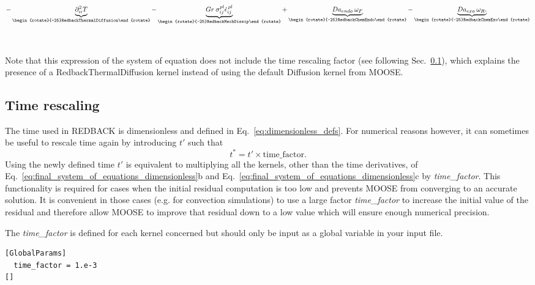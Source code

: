 \documentclass[]{scrreprt}
\newcommand{\moose}{{MOOSE}}
\newcommand{\redback}{{REDBACK}}
\newcommand{\pd}{\ensuremath{\partial}}
\begin{document}
\begin{align*}
  - \underbrace{ \pd_{ii}^2 T   }_{\begin{rotate}{-25}RedbackThermalDiffusion\end{rotate}}  
  - \underbrace{ Gr \: \sigma_{ij}^{pl}\dot{\epsilon}_{ij}^{\,pl}  }_{\begin{rotate}{-25}RedbackMechDissip\end{rotate}} 
  + \underbrace{ Da_{endo}\: \omega_F }_{\begin{rotate}{-25}RedbackChemEndo\end{rotate}} 
  - \underbrace{ Da_{exo}\: \omega_R. }_{\begin{rotate}{-25}RedbackChemExo\end{rotate}} \\ \\ \\
\end{align*}

Note that this expression of the system of equation does not include the time rescaling factor (see following Sec.~\ref{subsec:time_rescaling}), which explains the presence of a RedbackThermalDiffusion kernel instead of using the default Diffusion kernel from \moose{}.

\subsection{Time rescaling}
\label{subsec:time_rescaling}
The time used in \redback{} is dimensionless and defined in Eq.~\ref{eq:dimensionless_defs}. For numerical reasons however, it can sometimes be useful to rescale time again by introducing $t'$ such that
\begin{equation}
  t^* = t' \times \text{time\_factor}.
\end{equation}
Using the newly defined time $t'$ is equivalent to multiplying all the kernels, other than the time derivatives, of Eq.~\ref{eq:final_system_of_equations_dimensionless}b and Eq.~\ref{eq:final_system_of_equations_dimensionless}c by \textit{time\_factor}. This functionality is required for cases when the initial residual computation is too low and prevents \moose{} from converging to an accurate solution. It is convenient in those cases (e.g. for convection simulations) to use a large factor \textit{time\_factor} to increase the initial value of the residual and therefore allow \moose{} to improve that residual down to a low value which will ensure enough numerical precision. 

The \textit{time\_factor} is defined for each kernel concerned but should only be input as a global variable in your input file.
\begin{lstlisting}
[GlobalParams]
  time_factor = 1.e-3
[]
\end{lstlisting}
\end{document}
